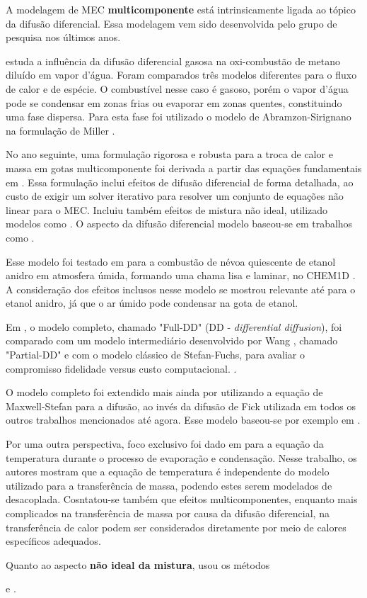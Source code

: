 
A modelagem de MEC \textbf{multicomponente} está intrinsicamente ligada ao tópico da difusão diferencial.
Essa modelagem vem sido desenvolvida pelo grupo de pesquisa nos últimos anos.

 estuda a influência da difusão diferencial gasosa na oxi-combustão de metano diluído em vapor d'água. 
Foram comparados três modelos diferentes para o fluxo de calor e de espécie.
O combustível nesse caso é gasoso, porém o vapor d'água pode se condensar em zonas frias ou evaporar em zonas quentes, constituindo uma fase dispersa.
Para esta fase foi utilizado o modelo de Abramzon-Sirignano \cite{Sirignano1989} na formulação de Miller \cite{MillerR1998}.

No ano seguinte, uma formulação rigorosa e robusta para a troca de calor e massa em gotas multicomponente foi derivada a partir das equações fundamentais em \cite{SacomanoF2022IJHMT}.
Essa formulação inclui efeitos de difusão diferencial de forma detalhada, ao custo de exigir um solver iterativo para resolver um conjunto de equações não linear para o MEC.
Incluiu também efeitos de mistura não ideal, utilizado modelos como .
O aspecto da difusão diferencial modelo baseou-se em trabalhos como \cite{ToniniS2015IJTS, ZhangL2012Fuel}. 

Esse modelo foi testado em \cite{SacomanoF2024CF} para a combustão de névoa quiescente de etanol anidro em atmosfera úmida, formando uma chama lisa e laminar, no CHEM1D \cite{Sommers1994PhD}.
A consideração dos efeitos inclusos nesse modelo se mostrou relevante até para o etanol anidro, já que o ar úmido pode condensar na gota de etanol.

Em \cite{SacomanoF2025CF}, o modelo completo, chamado "Full-DD" (DD - \emph{differential diffusion}), foi comparado com um modelo intermediário desenvolvido por Wang \cite{WangC2013CF}, chamado "Partial-DD" e com o modelo clássico de Stefan-Fuchs, para avaliar o compromisso fidelidade versus custo computacional.
.

O modelo completo foi extendido mais ainda por \cite{SantosA2024IJHMT} utilizando a equação de Maxwell-Stefan para a difusão, ao invés da difusão de Fick utilizada em todos os outros trabalhos mencionados até agora.
Esse modelo baseou-se por exemplo em \cite{ToniniS2015IJTS}.

Por uma outra perspectiva, foco exclusivo foi dado em \cite{SantosA2023IJHMT} para a equação da temperatura durante o processo de evaporação e condensação.
Nesse trabalho, os autores mostram que a equação de temperatura é independente do modelo utilizado para a transferência de massa, podendo estes serem modelados de desacoplada.
Cosntatou-se também que efeitos multicomponentes, enquanto mais complicados na transferência de massa por causa da difusão diferencial, na transferência de calor podem ser considerados diretamente por meio de calores específicos adequados.

Quanto ao aspecto \textbf{não ideal da mistura},  usou os métodos 

 e .